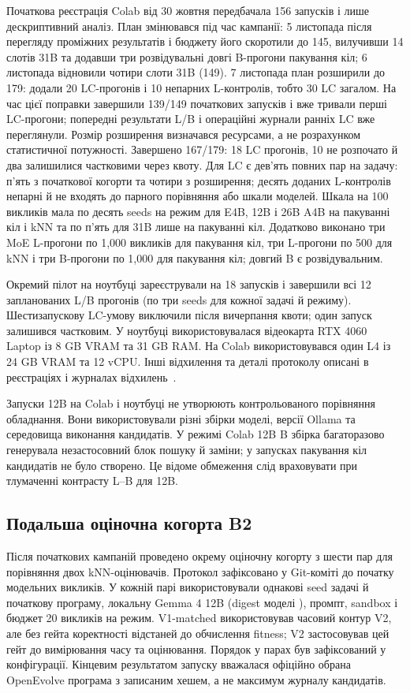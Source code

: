 \documentclass[11pt]{article}
\begin{document}
Початкова реєстрація Colab від 30 жовтня передбачала 156 запусків і лише дескриптивний аналіз. План змінювався під час кампанії: 5 листопада після перегляду проміжних результатів і бюджету його скоротили до 145, вилучивши 14 слотів 31B та додавши три розвідувальні довгі B-прогони пакування кіл; 6 листопада відновили чотири слоти 31B (149). 7 листопада план розширили до 179: додали 20 LC-прогонів і 10 непарних L-контролів, тобто 30 LC загалом. На час цієї поправки завершили 139/149 початкових запусків і вже тривали перші LC-прогони; попередні результати L/B і операційні журнали ранніх LC вже переглянули. Розмір розширення визначався ресурсами, а не розрахунком статистичної потужності. Завершено 167/179: 18 LC прогонів, 10 не розпочато й два залишилися частковими через квоту. Для LC є дев'ять повних пар на задачу: п'ять з початкової когорти та чотири з розширення; десять доданих L-контролів непарні й не входять до парного порівняння або шкали моделей. Шкала на 100 викликів мала по десять seeds на режим для E4B, 12B і 26B A4B на пакуванні кіл і kNN та по п'ять для 31B лише на пакуванні кіл. Додатково виконано три MoE L-прогони по 1{,}000 викликів для пакування кіл, три L-прогони по 500 для kNN і три B-прогони по 1{,}000 для пакування кіл; довгий B є розвідувальним.

Окремий пілот на ноутбуці зареєстрували на 18 запусків і завершили всі 12 запланованих L/B прогонів (по три seeds для кожної задачі й режиму). Шестизапускову LC-умову виключили після вичерпання квоти; один запуск залишився частковим. У ноутбуці використовувалася відеокарта RTX 4060 Laptop із 8 GB VRAM та 31 GB RAM. На Colab використовувався один L4 із 24 GB VRAM та 12 vCPU. Інші відхилення та деталі протоколу описані в реєстраціях і журналах відхилень~\citep{pylypenko2026artifacts}.

Запуски 12B на Colab і ноутбуці не утворюють контрольованого порівняння обладнання. Вони використовували різні збірки моделі, версії Ollama та середовища виконання кандидатів. У режимі Colab 12B B збірка багаторазово генерувала незастосовний блок пошуку й заміни; у запусках пакування кіл кандидатів не було створено. Це відоме обмеження слід враховувати при тлумаченні контрасту L--B для 12B.

\subsection{Подальша оціночна когорта B2}

Після початкових кампаній проведено окрему оціночну когорту з шести пар для порівняння двох kNN-оцінювачів. Протокол зафіксовано у Git-коміті  до початку модельних викликів. У кожній парі використовували однакові seed задачі й початкову програму, локальну Gemma 4 12B (digest моделі ), промпт, sandbox і бюджет 20 викликів на режим. V1-matched використовував часовий контур V2, але без гейта коректності відстаней до обчислення fitness; V2 застосовував цей гейт до вимірювання часу та оцінювання. Порядок у парах був зафіксований у конфігурації. Кінцевим результатом запуску вважалася офіційно обрана OpenEvolve програма з записаним хешем, а не максимум журналу кандидатів.
\end{document}
